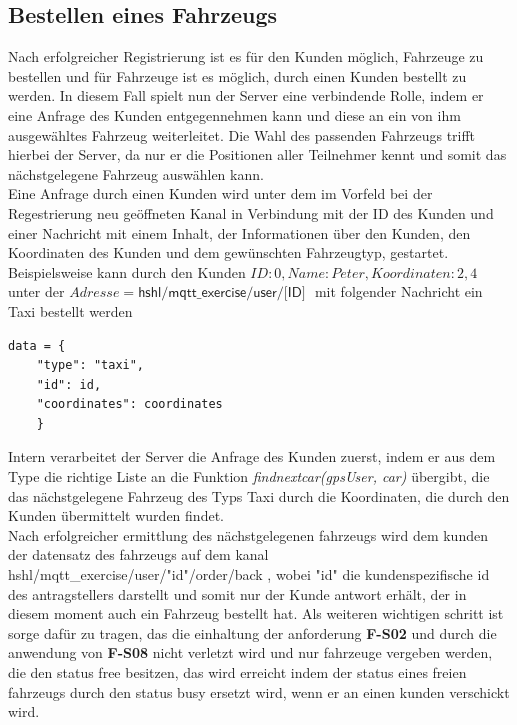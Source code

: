 \documentclass[conference]{IEEEtran}
\begin{document}
\subsection{Bestellen eines Fahrzeugs}
Nach erfolgreicher Registrierung ist es für den Kunden möglich, Fahrzeuge zu bestellen und für Fahrzeuge ist es möglich, durch einen Kunden bestellt zu werden. In diesem Fall spielt nun der Server eine verbindende Rolle, indem er eine Anfrage des Kunden entgegennehmen kann und diese an ein von ihm ausgewähltes Fahrzeug weiterleitet. Die Wahl des passenden Fahrzeugs trifft hierbei der Server, da nur er die Positionen aller Teilnehmer kennt und somit das nächstgelegene Fahrzeug auswählen kann.\\ 
Eine Anfrage durch einen Kunden wird unter dem im Vorfeld bei der Regestrierung neu geöffneten Kanal in Verbindung mit der ID des Kunden und einer Nachricht mit einem Inhalt, der Informationen über den Kunden, den Koordinaten des Kunden und dem gewünschten Fahrzeugtyp, gestartet. Beispielsweise kann durch den Kunden $ID: 0, Name: Peter, Koordinaten: 2,4$ unter der $Adresse=\textsf{hshl/mqtt\_exercise/user/[ID] }$ mit folgender Nachricht ein Taxi bestellt werden \begin{lstlisting}
data = {
	"type": "taxi",
    "id": id,
    "coordinates": coordinates
    }
\end{lstlisting}
Intern verarbeitet der Server die Anfrage des Kunden zuerst, indem er aus dem Type die richtige Liste an die Funktion \textit{findnextcar(gpsUser, car)} übergibt, die das nächstgelegene Fahrzeug des Typs Taxi durch die Koordinaten, die durch den Kunden übermittelt wurden findet.\\
Nach erfolgreicher ermittlung des nächstgelegenen fahrzeugs wird dem kunden der datensatz des fahrzeugs auf dem kanal \textsf{hshl/mqtt\_exercise/user/"id"/order/back} , wobei "id"  die kundenspezifische id des antragstellers darstellt und somit nur der Kunde antwort erhält, der in diesem moment auch ein Fahrzeug bestellt hat. Als weiteren wichtigen schritt ist sorge dafür zu tragen, das die einhaltung der anforderung \textbf{F-S02} und durch die anwendung von \textbf{F-S08}  nicht verletzt wird und nur fahrzeuge vergeben werden, die den status free besitzen, das wird erreicht indem der status eines freien fahrzeugs durch den status busy ersetzt wird, wenn er an einen kunden verschickt wird.
\end{document}
